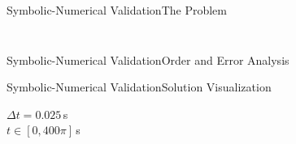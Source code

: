 \begin{frame}{Symbolic-Numerical Validation}{The Problem}
\begin{columns}
\begin{column}[t]{0.575\textwidth}
{      %
      }
    \end{column}
  \end{columns}
\end{frame}

\begin{frame}{Symbolic-Numerical Validation}{Order and Error Analysis}
  \vspace{-1.0em}
  \centering{\small{}}
\end{frame}

\begin{frame}{Symbolic-Numerical Validation}{Solution Visualization}
  \begin{minipage}[c]{0.22\textwidth}
    $\Delta t = 0.025$\,s \\ $t \in [0, 400\pi]$\,s
  \end{minipage}
  \begin{minipage}[c]{0.77\textwidth}
    \vspace{-2.0em}
    \small{}
    \small{}
  \end{minipage}
\end{frame}

